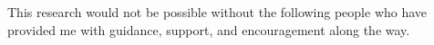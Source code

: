 
\begin{acknowledgments}
This research would not be possible without the following people who have provided me with guidance, support, and encouragement along the way.
\end{acknowledgments}
